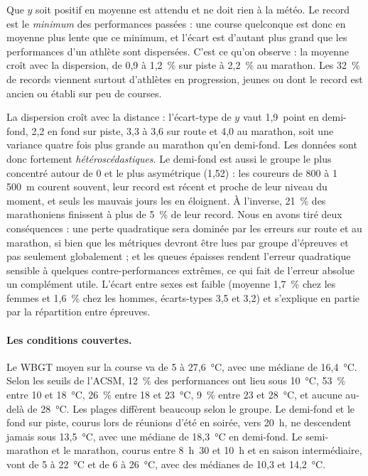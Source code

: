 \documentclass[11pt,a4paper]{article}
\begin{document}
Que $y$ soit positif en moyenne est attendu et ne doit rien à la météo. Le record est le \emph{minimum} des
performances passées : une course quelconque est donc en moyenne plus lente que ce minimum, et l'écart est d'autant
plus grand que les performances d'un athlète sont dispersées. C'est ce qu'on observe : la moyenne croît avec la
dispersion, de 0,9 à 1,2~\% sur piste à 2,2~\% au marathon. Les 32~\% de records viennent surtout d'athlètes en
progression, jeunes ou dont le record est ancien ou établi sur peu de courses.

La dispersion croît avec la distance : l'écart-type de $y$ vaut 1,9~point en demi-fond, 2,2 en fond sur piste, 3,3 à
3,6 sur route et 4,0 au marathon, soit une variance quatre fois plus grande au marathon qu'en demi-fond. Les données
sont donc fortement \emph{hétéroscédastiques}. Le demi-fond est aussi le groupe le plus concentré autour de 0 et le
plus asymétrique (1,52) : les coureurs de 800 à 1\,500~m courent souvent, leur record est récent et proche de leur
niveau du moment, et seuls les mauvais jours les en éloignent. À l'inverse, 21~\% des marathoniens finissent à plus de
5~\% de leur record. Nous en avons tiré deux conséquences : une perte quadratique sera dominée par les erreurs sur
route et au marathon, si bien que les métriques devront être lues par groupe d'épreuves et pas seulement globalement ;
et les queues épaisses rendent l'erreur quadratique sensible à quelques contre-performances extrêmes, ce qui fait de
l'erreur absolue un complément utile. L'écart entre sexes est faible (moyenne 1,7~\% chez les femmes et 1,6~\% chez
les hommes, écarts-types 3,5 et 3,2) et s'explique en partie par la répartition entre épreuves.

\paragraph{Les conditions couvertes.} Le WBGT moyen sur la course va de 5 à 27,6~°C, avec une médiane de 16,4~°C.
Selon les seuils de l'ACSM, 12~\% des performances ont lieu sous 10~°C, 53~\% entre 10 et 18~°C, 26~\% entre 18 et
23~°C, 9~\% entre 23 et 28~°C, et aucune au-delà de 28~°C. Les plages diffèrent beaucoup selon le groupe. Le demi-fond
et le fond sur piste, courus lors de réunions d'été en soirée, vers 20~h, ne descendent jamais sous 13,5~°C, avec une
médiane de 18,3~°C en demi-fond. Le semi-marathon et le marathon, courus entre 8~h~30 et 10~h et en saison
intermédiaire, vont de 5 à 22~°C et de 6 à 26~°C, avec des médianes de 10,3 et 14,2~°C.
\end{document}
